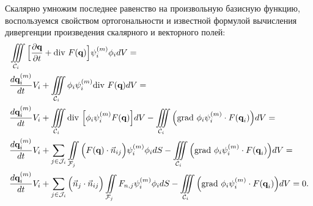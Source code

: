 \documentclass[14pt, a4paper, fleqn]{extreport}
\begin{document}
    Скалярно умножим последнее равенство на произвольную базисную функцию,
    воспользуемся свойством ортогональности и известной формулой вычисления 
    дивергенции произведения скалярного и векторного полей:
    \begin{equation}
    \label{hyperb_eqs_int_dg}
    \begin{split}
        &\iiint\limits_{\mathcal{C}_i} \Big[
            \dfrac{\partial \textbf{q}}{\partial t} + \text{div }{F(\textbf{q})} \Big]\psi_i^{(m)} \phi_i dV = 
        \\
        &\dfrac{d \textbf{q}_i^{(m)}}{d t}V_i 
            + \iiint\limits_{\mathcal{C}_i} \phi_i \psi_i^{(m)} \text{div }{F(\textbf{q})} dV =
        \\
        &\dfrac{d \textbf{q}_i^{(m)}}{d t}V_i 
            + \iiint\limits_{\mathcal{C}_i} \text{div }{\Big[ \phi_i \psi_i^{(m)} F(\textbf{q}) \Big]} dV
            - \iiint\limits_{\mathcal{C}_i} \Big( \text{grad }{\phi_i \psi_i^{(m)}} \cdot F(\textbf{q}_i) \Big) dV = 
        \\
        &\dfrac{d \textbf{q}_i^{(m)}}{d t}V_i 
            + \sum\limits_{j \in \mathcal{J}_i}\iint\limits_{\mathcal{F}_j} 
                \Big( F(\textbf{q}) \cdot \vec{n}_{ij} \Big) \psi_i^{(m)} \phi_i dS
            - \iiint\limits_{\mathcal{C}_i} \Big( \text{grad }{\phi_i \psi_i^{(m)}} \cdot F(\textbf{q}_i) \Big) dV = 
        \\
        &\dfrac{d \textbf{q}_i^{(m)}}{d t}V_i 
            + \sum\limits_{j \in \mathcal{J}_i} 
                \Big( \vec{n}_{j} \cdot \vec{n}_{ij} \Big) \iint\limits_{\mathcal{F}_j} F_{n,j} \psi_i^{(m)} \phi_i dS
            - \iiint\limits_{\mathcal{C}_i} \Big( \text{grad }{\phi_i \psi_i^{(m)}} \cdot F(\textbf{q}_i) \Big) dV 
            = 0. 
    \end{split}
    \end{equation}
    
    
\end{document}
